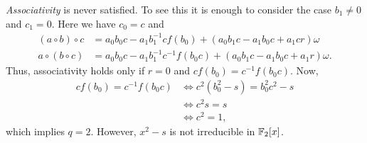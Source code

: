 \begin{xmpl}
    \textit{Associativity} is never satisfied. To see this it is enough to consider the case $b_1\ne0$ and $c_1=0$. Here we have $c_0=c$ and
    \begin{align*}
        (a\circ b)\circ c
            &= a_0b_0c - a_1b_1^{-1}cf(b_0)
                +(a_0b_1c-a_1b_0c+a_1cr)\omega\\
        a\circ(b\circ c)
            &= a_0b_0c-a_1b_1^{-1}c^{-1}f(b_0c)
                + (a_0b_1c-a_1b_0c+a_1r)\omega.
    \end{align*}
    Thus, associativity holds only if $r=0$ and $cf(b_0) = c^{-1}f(b_0c)$. Now,
    \begin{align*}
        cf(b_0) = c^{-1}f(b_0c) &\iff
        c^2(b_0^2-s) = b_0^2c^2-s\\
        &\iff c^2s = s\\
        &\iff c^2=1,
    \end{align*}
    which implies $q=2$. However, $x^2-s$ is not irreducible in $\Fq[2][x]$.
\end{xmpl}


